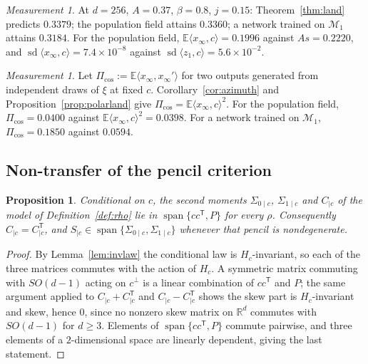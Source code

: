 \documentclass[11pt]{article}
\newtheorem{proposition}[lemma]{Proposition}
\theoremstyle{definition}
\theoremstyle{remark}
\newtheorem{measurement}[lemma]{Measurement}
\DeclareMathOperator{\spn}{span}
\DeclareMathOperator{\sd}{sd}
\newcommand{\R}{\mathbb{R}}
\newcommand{\E}{\mathbb{E}}
\newcommand{\T}{\mathsf{T}}
\begin{document}
\begin{measurement}\label{meas:land}
At $d=256$, $A=0.37$, $\beta=0.8$, $j=0.15$: Theorem~\ref{thm:land} predicts $0.3379$; the
population field attains $0.3360$; a network trained on $\mathcal M_1$ attains $0.3184$. For the
population field, $\E\langle x_\infty,c\rangle=0.1996$ against $As=0.2220$, and
$\sd\langle x_\infty,c\rangle=7.4\times10^{-8}$ against
$\sd\langle z_1,c\rangle=5.6\times10^{-2}$.
\end{measurement}

\begin{measurement}\label{meas:ring}
Let $\Pi_{\mathrm{cos}}:=\E\langle x_\infty,x_\infty'\rangle$ for two outputs generated from
independent draws of $\xi$ at fixed $c$. Corollary~\ref{cor:azimuth} and
Proposition~\ref{prop:polarland} give $\Pi_{\mathrm{cos}}=\E\langle x_\infty,c\rangle^{2}$. For the
population field, $\Pi_{\mathrm{cos}}=0.0400$ against $\E\langle x_\infty,c\rangle^{2}=0.0398$. For
a network trained on $\mathcal M_1$, $\Pi_{\mathrm{cos}}=0.1850$ against $0.0594$.
\end{measurement}

\subsection{Non-transfer of the pencil criterion}

\begin{proposition}\label{prop:codiag}
Conditional on $c$, the second moments $\Sigma_{0\mid c}$, $\Sigma_{1\mid c}$ and $C_{\mid c}$ of
the model of Definition~\ref{def:rho} lie in $\spn\{cc^{\T},P\}$ for every $\rho$. Consequently
$C_{\mid c}=C_{\mid c}^{\T}$, and $S_{\mid c}\in\spn\{\Sigma_{0\mid c},\Sigma_{1\mid c}\}$ whenever
that pencil is nondegenerate.
\end{proposition}

\begin{proof}
By Lemma~\ref{lem:invlaw} the conditional law is $H_c$-invariant, so each of the three matrices
commutes with the action of $H_c$. A symmetric matrix commuting with $SO(d-1)$ acting on
$c^{\perp}$ is a linear combination of $cc^{\T}$ and $P$; the same argument applied to
$C_{\mid c}+C_{\mid c}^{\T}$ and $C_{\mid c}-C_{\mid c}^{\T}$ shows the skew part is $H_c$-invariant
and skew, hence $0$, since no nonzero skew matrix on $\R^{d}$ commutes with $SO(d-1)$ for
$d\geq3$. Elements of $\spn\{cc^{\T},P\}$ commute pairwise, and three elements of a
$2$-dimensional space are linearly dependent, giving the last statement.
\end{proof}
\end{document}
